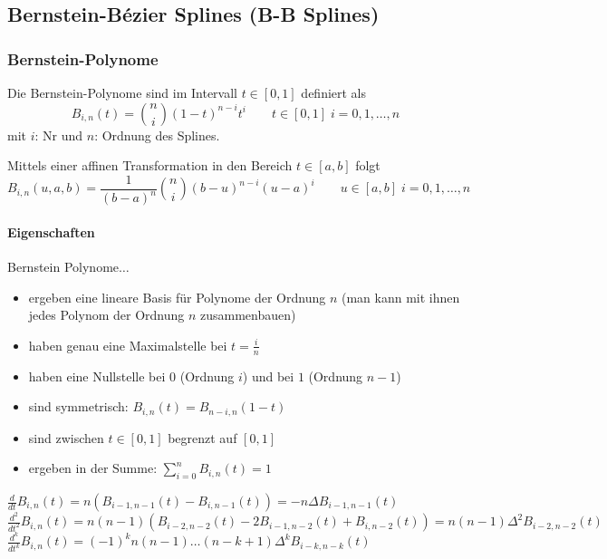  
\newpage
\subsection{Bernstein-Bézier Splines (B-B Splines)}

\begin{minipage}[c]{15.0cm}	
	\subsubsection{Bernstein-Polynome}
    	Die Bernstein-Polynome sind im Intervall $t\in[0,1]$ definiert als
	    \[B_{i,n}(t) = \binom{n}{i}(1-t)^{n-i} t^i \qquad t \in [0,1]\; i=0,1,\ldots, n\]
	    mit $i$: Nr und  $n$: Ordnung des Splines.
	    
        Mittels einer affinen Transformation in den Bereich $t \in [a,b]$ folgt	    
	    \[B_{i,n}(u,a,b) =\frac{1}{(b-a)^n}\binom{n}{i}(b-u)^{n-i} (u-a)^i \qquad u \in [a,b]\; i=0,1,\ldots, n\]
	    
	\paragraph{Eigenschaften}
		Bernstein Polynome$\ldots$
	    \begin{itemize}
	      \item ergeben eine lineare Basis für Polynome der Ordnung $n$ (man kann mit ihnen jedes Polynom der Ordnung $n$ zusammenbauen)
	      \item haben genau eine Maximalstelle bei $t=\frac in$
	      \item haben eine Nullstelle bei $0$ (Ordnung $i$) und bei $1$ (Ordnung $n-1$)
	      \item sind symmetrisch: $B_{i,n}(t) = B_{n-i,n}(1-t)$
	      \item sind zwischen $t \in [0,1]$ begrenzt auf $[0,1]$
	      \item ergeben in der Summe: $\sum \limits_{i=0}^n B_{i,n}(t)=1$
	    \end{itemize}
	    
	    $\frac{d}{dt} B_{i,n}(t) = n(B_{i-1,n-1}(t) - B_{i,n-1}(t)) = -n \Delta B_{i-1,n-1}(t)$\\
	    $\frac{d^2}{dt^2} B_{i,n}(t) = n(n-1)(B_{i-2,n-2}(t) -2 B_{i-1,n-2}(t) + B_{i,n-2}(t)) = n(n-1) \Delta^2 B_{i-2,n-2}(t)$\\
	    $\frac{d^k}{dt^k} B_{i,n}(t) = (-1)^k n(n-1)\ldots(n-k+1) \Delta^k B_{i-k,n-k}(t)$
\end{minipage}
\hfill    
